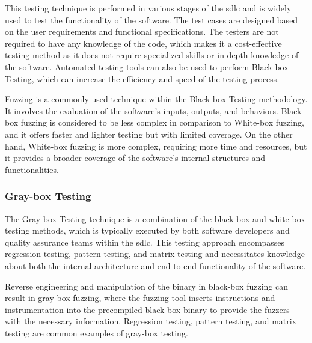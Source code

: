 This testing technique is performed in various stages of the \acrshort{sdlc} and is widely used to
test the functionality of the software. The test cases are designed based on the user requirements
and functional specifications. The testers are not required to have any knowledge of the code, which
makes it a cost-effective testing method as it does not require specialized skills or in-depth
knowledge of the software. Automated testing tools can also be used to perform Black-box Testing,
which can increase the efficiency and speed of the testing
process\cite{jamil2016software}\cite{pudas2017improving}.

Fuzzing is a commonly used technique within the Black-box Testing methodology. It involves the
evaluation of the software's inputs, outputs, and behaviors. Black-box fuzzing is considered to
be less complex in comparison to White-box fuzzing, and it offers faster and lighter testing but
with limited coverage. On the other hand, White-box fuzzing is more complex, requiring more time
and resources, but it provides a broader coverage of the software's internal structures and
functionalities\cite{godefroid2008grammar}.

\subsubsection{Gray-box Testing}
The Gray-box Testing technique is a combination of the black-box and white-box testing methods,
which is typically executed by both software developers and quality assurance teams within the
\acrshort{sdlc}. This testing approach encompasses regression testing, pattern testing,
and matrix testing and necessitates knowledge about both the internal architecture and end-to-end
functionality of the software\cite{jamil2016software}.

Reverse engineering and manipulation of the binary in black-box fuzzing can result in gray-box
fuzzing, where the fuzzing tool inserts instructions and instrumentation into the precompiled
black-box binary to provide the fuzzers with the necessary information. Regression testing,
pattern testing, and matrix testing are common examples of gray-box
testing\cite{wilson2018evaluation}.
\clearpage

